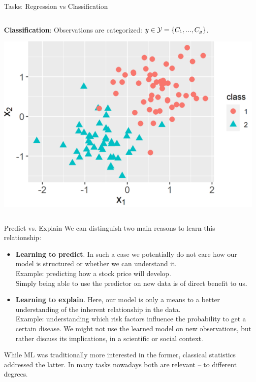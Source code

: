 \documentclass[11pt,compress,t,notes=noshow, xcolor=table]{beamer}
\begin{document}
\begin{vbframe}{Tasks: Regression vs Classification}
\begin{columns}
\begin{column}{0.5\textwidth}
\textbf{Classification}: Observations are categorized: $y \in \mathcal{Y} = \{C_1,...,C_g\}$.

  \begin{center}
    \includegraphics[width=\textwidth]{figure/ml-basics-supervised-classif-task.png}
  \end{center}
\end{column}
\end{columns}

\end{vbframe}

\begin{vbframe}{Predict vs. Explain}
We can distinguish two main reasons to learn this relationship:


\begin{itemize}
    \item \textbf{Learning to predict}. In such a case we potentially do not care how
        our model is structured or whether we can understand it.\\
        Example: predicting how a stock price will develop. \\
        Simply being able to use the predictor on new data is of direct benefit to us.

    \item \textbf{Learning to explain}. Here, our model is only a means to
        a better understanding of the inherent relationship in the data.\\
        Example: understanding which risk factors influence the probability to
        get a certain disease.
        We might not use the learned model on new observations, but rather
        discuss its implications, in a scientific or social context.

\end{itemize}

While ML was traditionally more interested in the former, classical statistics
addressed the latter. In many tasks nowadays both are relevant -- to different degrees.

\end{vbframe}
\end{document}
